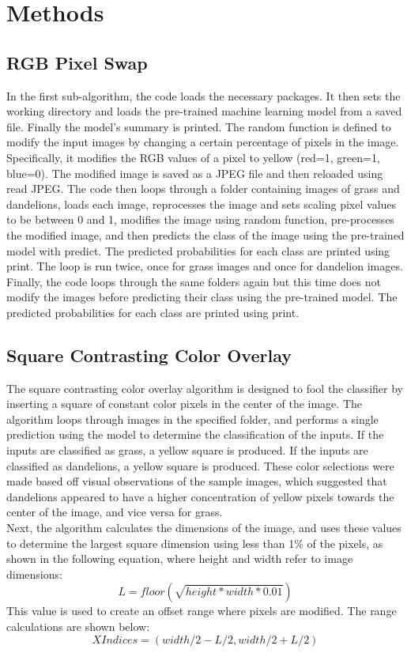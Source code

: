 \documentclass{article}
\begin{document}
\section{Methods}
\subsection{RGB Pixel Swap}
In the first sub-algorithm, the code loads the necessary packages. It then sets the working directory and loads the pre-trained machine learning model from a saved file. Finally the model's summary is printed. The random function is defined to modify the input images by changing a certain percentage of pixels in the image. Specifically, it modifies the RGB values of a pixel to yellow (red=1, green=1, blue=0). The modified image is saved as a JPEG file and then reloaded using read JPEG. The code then loops through a folder containing images of grass and dandelions, loads each image, reprocesses the image and sets scaling pixel values to be between 0 and 1, modifies the image using random function, pre-processes the modified image, and then predicts the class of the image using the pre-trained model with predict. The predicted probabilities for each class are printed using print. The loop is run twice, once for grass images and once for dandelion images. Finally, the code loops through the same folders again but this time does not modify the images before predicting their class using the pre-trained model. The predicted probabilities for each class are printed using print.


\subsection{Square Contrasting Color Overlay}
The square contrasting color overlay algorithm is designed to fool the classifier by inserting a square of constant color pixels in the center of the image. The algorithm loops through images in the specified folder, and performs a single prediction using the model to determine the classification of the inputs. If the inputs are classified as grass, a yellow square is produced. If the inputs are classified as dandelions, a yellow square is produced. These color selections were made based off visual observations of the sample images, which suggested that dandelions appeared to have a higher concentration of yellow pixels towards the center of the image, and vice versa for grass. \\
Next, the algorithm calculates the dimensions of the image, and uses these values to determine the largest square dimension using less than 1\% of the pixels, as shown in the following equation, where height and width refer to image dimensions:
\begin{equation} \label{eqn}
    L = floor(\sqrt{height * width * 0.01})
\end{equation}
This value is used to create an offset range where pixels are modified. The range calculations are shown below:
\begin{equation} \label{eqn}
    X Indices = (width/2 - L/2, width/2 + L/2)
\end{equation}
\end{document}
